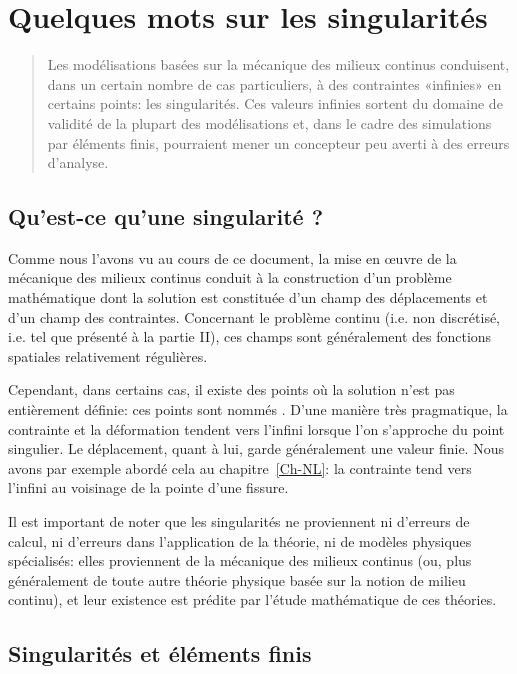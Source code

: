 \chapter{Quelques mots sur les singularités}\label{Ch-Singul}

\begin{abstract}
Les modélisations basées sur la mécanique des milieux continus conduisent, dans un certain nombre de cas particuliers, à des contraintes «infinies» en certains points: les singularités. Ces valeurs infinies sortent du domaine de validité de la plupart des modélisations et, dans le cadre des simulations par éléments finis, pourraient mener un concepteur peu averti à des erreurs d'analyse.
\end{abstract}


\medskip
\section{Qu'est-ce qu'une singularité ?}

Comme nous l'avons vu au cours de ce document, la mise en œuvre de la mécanique des milieux continus conduit à la construction d'un problème mathématique dont la solution est constituée d'un champ des déplacements et d'un champ des contraintes. Concernant le problème continu (i.e. non discrétisé, i.e. tel que présenté à la partie II), ces champs sont généralement des fonctions spatiales relativement régulières.

\medskip
Cependant, dans certains cas, il existe des points où la solution n'est pas entièrement définie: ces points sont nommés . D'une manière très pragmatique, la contrainte et la déformation tendent vers l'infini lorsque l'on s'approche du point singulier. Le déplacement, quant à lui, garde généralement une valeur finie. Nous avons par exemple abordé cela au chapitre~\ref{Ch-NL}: la contrainte tend vers l'infini au voisinage de la pointe d'une fissure.

\medskip
Il est important de noter que les singularités ne proviennent ni d'erreurs de calcul, ni d'erreurs dans l'application de la théorie, ni de modèles physiques spécialisés: elles proviennent de la mécanique des milieux continus (ou, plus généralement de toute autre théorie physique basée sur la notion de milieu continu), et leur existence est prédite par l'étude mathématique de ces théories.

\medskip
\section{Singularités et éléments finis}

